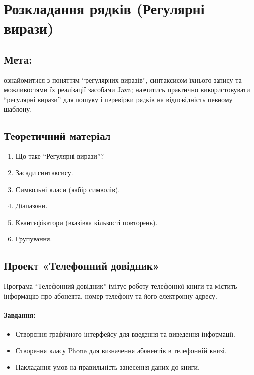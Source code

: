 \section{Розкладання рядків (Регулярні вирази)}

\subsection{Мета:}
ознайомитися з поняттям “регулярних виразів”, синтаксисом їхнього запису та можливостями їх реалізації засобами Java; навчитись практично використовувати “регулярні вирази” для пошуку і перевірки рядків на відповідність певному шаблону.

\subsection{Теоретичний матеріал}

\begin{enumerate}
	\item Що таке “Регулярні вирази”?
	\item Засади синтаксису.
	\item Символьні класи (набір символів).
	\item Діапазони.
	\item Квантифікатори (вказівка кількості повторень).
	\item Групування.
\end{enumerate}

\subsection{Проект «Телефонний довідник»}

Програма “Телефонний довідник” імітує роботу телефонної книги та містить інформацію про абонента, номер телефону та його електронну адресу. 


\paragraph{Завдання:}
\begin{itemize}
	\item Створення графічного інтерфейсу для введення та виведення інформації.
	\item Створення класу Phone для визначення абонентів  в телефонній книзі.
	\item Накладання умов на правильність занесення даних до книги.
\end{itemize}

